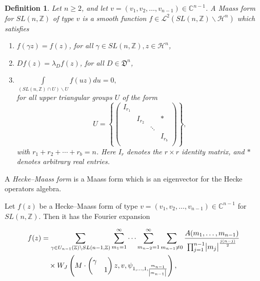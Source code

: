 \documentclass[sn-mathphys,Numbered]{sn-jnl}
\theoremstyle{thmstyleone}%
\theoremstyle{thmstyletwo}%
\theoremstyle{thmstylethree}%
\newtheorem{definition}{Definition}%
\begin{document}
\begin{definition} \cite{Dg}
Let $n \geq 2$, and let $v=(v_1,v_2,\dots,v_{n-1}) \in \mathbb{C}^{n-1}$. A Maass form for $SL(n,\mathbb{Z})$ of type $v$ is a smooth function $f \in \mathcal{L}^2(SL(n,\mathbb{Z}) \backslash \mathcal{H}^n)$ which satisfies
\begin{enumerate}
\item $f(\gamma z) = f(z)$, for all $\gamma \in SL(n,\mathbb{Z}), z \in \mathcal{H}^n$,
\item $Df(z) = \lambda_D f(z)$, for all $D \in \mathfrak{D}^n$,
\item $\int \limits_{(SL(n,\mathbb{Z}) \cap U) \backslash U} f(uz) du = 0, $\\
for all upper triangular groups $U$ of the form 
$$U = \left\{
\begin{pmatrix} 
I_{r_1} &             &           &  \\
           & I_{r_2}  &           & *\\ 
           &             & \ddots &   \\ 
           &             &           & I_{r_b}  \\ 
\end{pmatrix} \right\}, $$
with $r_1+r_2+\cdots+r_b=n$. Here $I_r$ denotes the $r \times r$ identity matrix, and $*$ denotes arbitrary real entries. \\
\end{enumerate}
\end{definition}

\noindent
A \emph{Hecke--Maass form} is a Maass form which is an eigenvector for the Hecke operators algebra. 

\noindent
Let $f(z)$ be a Hecke--Maass form of type $v=(v_1,v_2,\dots,v_{n-1}) \in \mathbb{C}^{n-1}$ for $SL(n,\mathbb{Z})$. Then it has the Fourier expansion 

\begin{align*}
f(z) &= \sum_{\gamma \in U_{n-1}(\mathbb{Z}) \backslash SL(n-1,\mathbb{Z})} \sum_{m_1=1}^{\infty} \dots \sum_{m_{n-2}=1}^{\infty} \sum_{m_{n-1} \neq 0} \frac{A(m_1,\dots,m_{n-1})}{\prod_{j=1}^{n-1} \abs{m_j}^\frac{j(n-j)}{2}} \\
& \quad \times W_J \left( M \cdot \begin{pmatrix} \gamma &  \\  & 1 \end{pmatrix} z, v, \psi_{1,\dots,1,\frac{m_{n-1}}{\abs{m_{n-1}}}}\right) ,
\end{align*}
\end{document}
